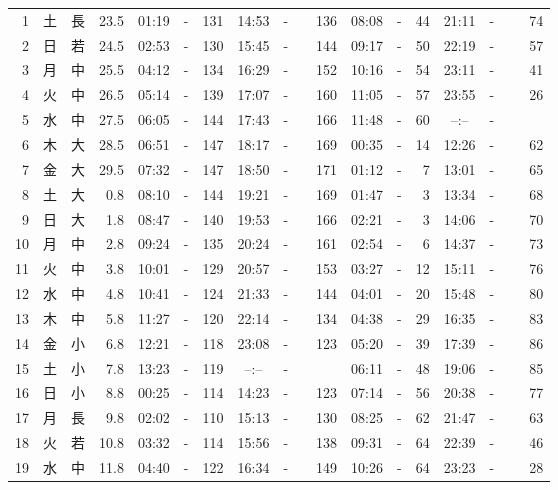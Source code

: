 \documentclass[12pt.a4j]{jsarticle}
\begin{document}
\begin{center}
\begin{table}[ht]
\begin{tabular}{|rc|cr|ccrccr|ccrccr|}
 \hline
 1 & 土 & 長 & 23.5 &  01:19 &-& 131  &  14:53 &-& 136  &   08:08 &-&  44  &   21:11 &-&  74  \\
 2 & 日 & 若 & 24.5 &  02:53 &-& 130  &  15:45 &-& 144  &   09:17 &-&  50  &   22:19 &-&  57  \\
 3 & 月 & 中 & 25.5 &  04:12 &-& 134  &  16:29 &-& 152  &   10:16 &-&  54  &   23:11 &-&  41  \\
 4 & 火 & 中 & 26.5 &  05:14 &-& 139  &  17:07 &-& 160  &   11:05 &-&  57  &   23:55 &-&  26  \\
 5 & 水 & 中 & 27.5 &  06:05 &-& 144  &  17:43 &-& 166  &   11:48 &-&  60  &   --:-- &-&~~~~~ \\
 6 & 木 & 大 & 28.5 &  06:51 &-& 147  &  18:17 &-& 169  &   00:35 &-&  14  &   12:26 &-&  62  \\
 7 & 金 & 大 & 29.5 &  07:32 &-& 147  &  18:50 &-& 171  &   01:12 &-&   7  &   13:01 &-&  65  \\
 8 & 土 & 大 &  0.8 &  08:10 &-& 144  &  19:21 &-& 169  &   01:47 &-&   3  &   13:34 &-&  68  \\
 9 & 日 & 大 &  1.8 &  08:47 &-& 140  &  19:53 &-& 166  &   02:21 &-&   3  &   14:06 &-&  70  \\
10 & 月 & 中 &  2.8 &  09:24 &-& 135  &  20:24 &-& 161  &   02:54 &-&   6  &   14:37 &-&  73  \\
11 & 火 & 中 &  3.8 &  10:01 &-& 129  &  20:57 &-& 153  &   03:27 &-&  12  &   15:11 &-&  76  \\
12 & 水 & 中 &  4.8 &  10:41 &-& 124  &  21:33 &-& 144  &   04:01 &-&  20  &   15:48 &-&  80  \\
13 & 木 & 中 &  5.8 &  11:27 &-& 120  &  22:14 &-& 134  &   04:38 &-&  29  &   16:35 &-&  83  \\
14 & 金 & 小 &  6.8 &  12:21 &-& 118  &  23:08 &-& 123  &   05:20 &-&  39  &   17:39 &-&  86  \\
15 & 土 & 小 &  7.8 &  13:23 &-& 119  &  --:-- &-&~~~~~ &   06:11 &-&  48  &   19:06 &-&  85  \\
16 & 日 & 小 &  8.8 &  00:25 &-& 114  &  14:23 &-& 123  &   07:14 &-&  56  &   20:38 &-&  77  \\
17 & 月 & 長 &  9.8 &  02:02 &-& 110  &  15:13 &-& 130  &   08:25 &-&  62  &   21:47 &-&  63  \\
18 & 火 & 若 & 10.8 &  03:32 &-& 114  &  15:56 &-& 138  &   09:31 &-&  64  &   22:39 &-&  46  \\
19 & 水 & 中 & 11.8 &  04:40 &-& 122  &  16:34 &-& 149  &   10:26 &-&  64  &   23:23 &-&  28  \\

\end{tabular}
\end{table}
\end{center}
\end{document}
